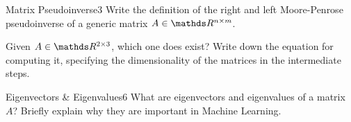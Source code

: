 \begin{questions}
\begin{question}{Matrix Pseudoinverse}{3}
	Write the definition of the right and left Moore-Penrose pseudoinverse of a generic matrix $A \in \R^{n\times m}$.
	
	Given $A \in \R^{2 \times 3}$, which one does exist? Write down the equation for computing it, specifying the dimensionality of the matrices in the intermediate steps.
	
\begin{answer}\end{answer}
\end{question}


\begin{question}{Eigenvectors \& Eigenvalues}{6}
What are eigenvectors and eigenvalues of a matrix $A$? Briefly explain why they are important in Machine Learning.

\begin{answer}\end{answer}

\end{question}


\end{questions}
